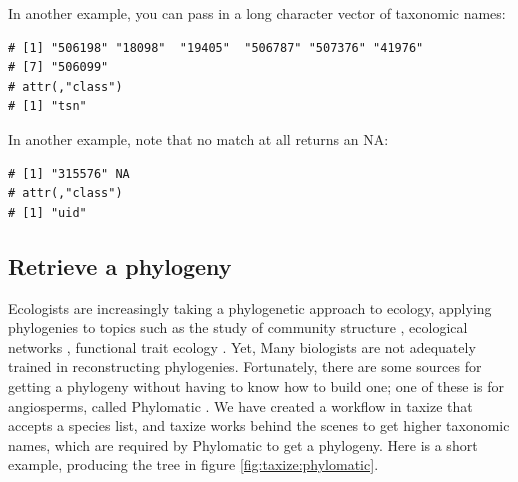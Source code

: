 \begin{sloppypar}
In another example, you can pass in a long character vector of taxonomic names:

\begin{knitrout}
\small
{}
\color{fgcolor}
\begin{kframe}
\begin{alltt}
 \hlkwb{<-} \hlstd{(}\hlstd{,} \hlstd{,}
            \hlstd{,} \hlstd{,}
            \hlstd{,} \hlstd{,}
            \hlstd{)}
\hlstd{(}   \hlstd{=} \hlstd{)}
\end{alltt}
\begin{verbatim}
# [1] "506198" "18098"  "19405"  "506787" "507376" "41976" 
# [7] "506099"
# attr(,"class")
# [1] "tsn"
\end{verbatim}
\end{kframe}
\end{knitrout}

In another example, note that no match at all returns an NA:

\begin{knitrout}
\small
{}
\color{fgcolor}
\begin{kframe}
\begin{alltt}
\hlstd{(} \hlstd{=} \hlstd{(}\hlstd{,} \hlstd{))}
\end{alltt}
\begin{verbatim}
# [1] "315576" NA      
# attr(,"class")
# [1] "uid"
\end{verbatim}
\end{kframe}
\end{knitrout}


\subsection{Retrieve a phylogeny}
Ecologists are increasingly taking a phylogenetic approach to ecology, applying phylogenies to topics such as the study of community structure \citep{webb2002phylogenies}, ecological networks \citep{rafferty2013phylogenetic}, functional trait ecology \citep{poff2006functional}. 
Yet, Many biologists are not adequately trained in reconstructing phylogenies.
Fortunately, there are some sources for getting a phylogeny without having to know how to build one; one of these is for angiosperms, called Phylomatic \citep{webb2005}. 
We have created a workflow in taxize that accepts a species list, and taxize works behind the scenes to get higher taxonomic names, which are required by Phylomatic to get a phylogeny. 
Here is a short example, producing the tree in figure \ref{fig:taxize:phylomatic}.


\end{sloppypar}

